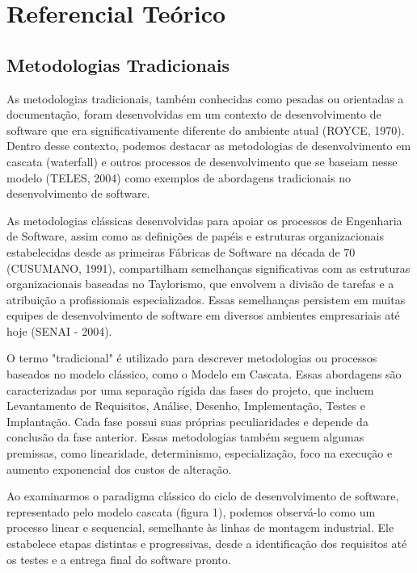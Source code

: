 \chapter{Referencial Teórico}\label{cap:referencial-teorico}
\section{Metodologias Tradicionais}
As metodologias tradicionais, também conhecidas como pesadas ou orientadas a documentação, foram desenvolvidas em um contexto de desenvolvimento de software que era significativamente diferente do ambiente atual (ROYCE, 1970). Dentro desse contexto, podemos destacar as metodologias de desenvolvimento em cascata (waterfall) e outros processos de desenvolvimento que se baseiam nesse modelo (TELES, 2004) como exemplos de abordagens tradicionais no desenvolvimento de software.

As metodologias clássicas desenvolvidas para apoiar os processos de Engenharia de Software, assim como as definições de papéis e estruturas organizacionais estabelecidas desde as primeiras Fábricas de Software na década de 70 (CUSUMANO, 1991), compartilham semelhanças significativas com as estruturas organizacionais baseadas no Taylorismo, que envolvem a divisão de tarefas e a atribuição a profissionais especializados. Essas semelhanças persistem em muitas equipes de desenvolvimento de software em diversos ambientes empresariais até hoje (SENAI - 2004).

O termo "tradicional" é utilizado para descrever metodologias ou processos baseados no modelo clássico, como o Modelo em Cascata. Essas abordagens são caracterizadas por uma separação rígida das fases do projeto, que incluem Levantamento de Requisitos, Análise, Desenho, Implementação, Testes e Implantação. Cada fase possui suas próprias peculiaridades e depende da conclusão da fase anterior. Essas metodologias também seguem algumas premissas, como linearidade, determinismo, especialização, foco na execução e aumento exponencial dos custos de alteração.

Ao examinarmos o paradigma clássico do ciclo de desenvolvimento de software, representado pelo modelo cascata (figura 1), podemos observá-lo como um processo linear e sequencial, semelhante às linhas de montagem industrial. Ele estabelece etapas distintas e progressivas, desde a identificação dos requisitos até os testes e a entrega final do software pronto.

